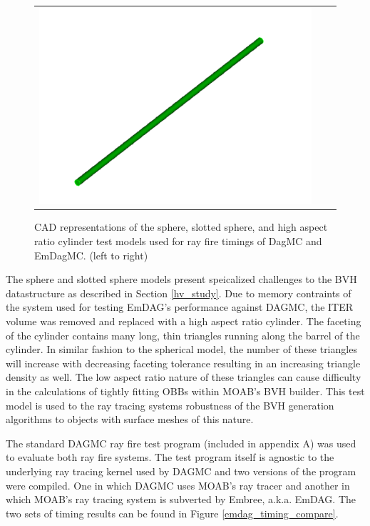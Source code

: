\documentclass[12pt, a4paper]{article}
\begin{document}
\begin{figure}[H]
\begin{center}
\begin{tabular}{ccc}
      \includegraphics[scale=0.13]{larcyl.png} \\
    \end{tabular}
    \caption{CAD representations of the sphere, slotted sphere, and high aspect ratio cylinder test models used for ray fire timings of DagMC and EmDagMC. (left to right) \label{models}}
  \end{center}
\end{figure} 


The sphere and slotted sphere models present speicalized challenges to the BVH datastructure as described in Section \ref{hv_study}. Due to memory contraints of the system used for testing EmDAG's performance against DAGMC, the ITER volume was removed and replaced with a high aspect ratio cylinder. The faceting of the cylinder contains many long, thin triangles running along the barrel of the cylinder. In similar fashion to the spherical model, the number of these triangles will increase with decreasing faceting tolerance resulting in an increasing triangle density as well. The low aspect ratio nature of these triangles can cause difficulty in the calculations of tightly fitting OBBs within MOAB's BVH builder. This test model is used to the ray tracing systems robustness of the BVH generation algorithms to objects with surface meshes of this nature.

The standard DAGMC ray fire test program (included in appendix A) was used to evaluate both ray fire systems. The test program itself is agnostic to the underlying ray tracing kernel used by DAGMC and two versions of the program were compiled. One in which DAGMC uses MOAB's ray tracer and another in which MOAB's ray tracing system is subverted by Embree, a.k.a. EmDAG. The two sets of timing results can be found in Figure \ref{emdag_timing_compare}.
\end{document}
